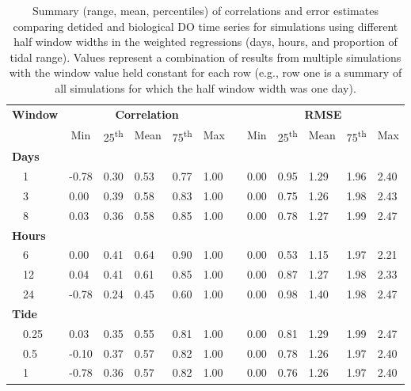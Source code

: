 \documentclass[letterpaper,12pt,oneside]{article}\usepackage[]{graphicx}\usepackage[]{color}
\begin{document}
\begin{table}[!tbp]
\caption{Summary (range, mean, percentiles) of correlations and error estimates comparing detided and biological \ac{DO} time series for simulations using different half window widths in the weighted regressions (days, hours, and proportion of tidal range).  Values represent a combination of results from multiple simulations with the window value held constant for each row (e.g., row one is a summary of all simulations for which the half window width was one day).\label{tab:dtd_perf2}} 
\begin{center}
\begin{tabular}{llllllclllll}
\hline\hline
\multicolumn{1}{l}{\bfseries Window}&\multicolumn{5}{c}{\bfseries Correlation}&\multicolumn{1}{c}{\bfseries }&\multicolumn{5}{c}{\bfseries RMSE}\tabularnewline
\cline{2-6} \cline{8-12}
\multicolumn{1}{l}{}&\multicolumn{1}{c}{Min}&\multicolumn{1}{c}{25\textsuperscript{th}}&\multicolumn{1}{c}{Mean}&\multicolumn{1}{c}{75\textsuperscript{th}}&\multicolumn{1}{c}{Max}&\multicolumn{1}{c}{}&\multicolumn{1}{c}{Min}&\multicolumn{1}{c}{25\textsuperscript{th}}&\multicolumn{1}{c}{Mean}&\multicolumn{1}{c}{75\textsuperscript{th}}&\multicolumn{1}{c}{Max}\tabularnewline
\hline
{\bfseries Days}&&&&&&&&&&&\tabularnewline
~~1&-0.78&0.30&0.53&0.77&1.00&&0.00&0.95&1.29&1.96&2.40\tabularnewline
~~3& 0.00&0.39&0.58&0.83&1.00&&0.00&0.75&1.26&1.98&2.43\tabularnewline
~~8& 0.03&0.36&0.58&0.85&1.00&&0.00&0.78&1.27&1.99&2.47\tabularnewline
\hline
{\bfseries Hours}&&&&&&&&&&&\tabularnewline
~~6& 0.00&0.41&0.64&0.90&1.00&&0.00&0.53&1.15&1.97&2.21\tabularnewline
~~12& 0.04&0.41&0.61&0.85&1.00&&0.00&0.87&1.27&1.98&2.33\tabularnewline
~~24&-0.78&0.24&0.45&0.60&1.00&&0.00&0.98&1.40&1.98&2.47\tabularnewline
\hline
{\bfseries Tide}&&&&&&&&&&&\tabularnewline
~~0.25& 0.03&0.35&0.55&0.81&1.00&&0.00&0.81&1.29&1.99&2.47\tabularnewline
~~0.5&-0.10&0.37&0.57&0.82&1.00&&0.00&0.78&1.26&1.97&2.40\tabularnewline
~~1&-0.78&0.36&0.57&0.82&1.00&&0.00&0.76&1.26&1.97&2.40\tabularnewline
\hline
\end{tabular}
\end{center}
\end{table}
\end{document}
